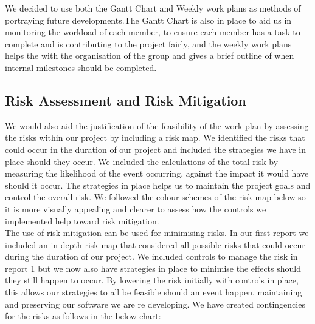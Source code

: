 We decided to use both the Gantt Chart and Weekly work plans as methods of portraying future developments.The Gantt Chart is also in place to aid us in monitoring the workload of each member, to ensure each member has a task to complete and is contributing to the project fairly, and the weekly work plans helps the with the organisation of the group and gives a brief outline of when internal milestones should be completed. \\

\subsection*{Risk Assessment and Risk Mitigation}

We would also aid the justification of the feasibility of the  work plan by assessing the risks within our project by including a risk map. We identified the risks that could occur in the duration of our project and included the strategies we have in place should they occur. We included the calculations of the total risk by measuring the likelihood of the event occurring, against the impact it would have should it occur. The strategies in place helps us to maintain the project goals and control the overall risk. We followed the colour schemes of the risk map below so it is more visually appealing and clearer to assess how the controls we implemented help toward risk mitigation. \\



The use of risk mitigation can be used for minimising risks. In our first report we included an in depth risk map that considered all possible risks that could occur during the duration of our project. We included controls to manage the risk in report 1 but we now also have strategies in place to minimise the effects should they still happen to occur. By lowering the risk initially with controls in place, this allows our strategies to all be feasible should an event happen, maintaining and preserving our software we are re developing. We have created contingencies for the risks as follows in the below chart: \\   

 



